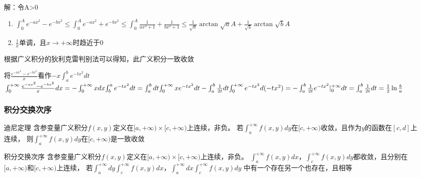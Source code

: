 \documentclass[xetex]{beamer}
\begin{document}
\begin{frame}
    解：令A>0
    \begin{enumerate}
        \item $\int_0^A{e^{-ax^2}-e^{-bx^2}}\le \int_0^A{e^{-ax^2}+e^{-bx^2}}\le \int_0^A{\frac{1}{ax^2+1}+\frac{1}{bx^2+1}}\le \frac{1}{\sqrt{a}}\arctan{\sqrt{a}A}+\frac{1}{\sqrt{b}}\arctan{\sqrt{b}A}$
        \item $\frac{1}{x}$单调，且$x\to +\infty$时趋近于0
    \end{enumerate}
    根据广义积分的狄利克雷判别法可以得知，此广义积分一致收敛

    将$\frac{e^{-ax^2}-e^{-bx^2}}{x}$看作$-x\int_a^b{e^{-tx^2}dt}$
    $\newline\int_{0}^{+\infty}{\frac{e^{-ax^2}-e^{-bx^2}}{x}dx}=-\int_{0}^{+\infty}{xdx}{\int_b^a{e^{-tx^2}dt}}
    =\int_{a}^{b}{dt}{\int_0^{+\infty}{xe^{-tx^2}dt}}
    \newline -\int_{a}^{b}{\frac{1}{2t}dt}{\int_0^{+\infty}{e^{-tx^2}d(-tx^2)}}
    =-\int_{a}^{b}{\frac{1}{2t}e^{-tx^2}|^{+\infty}_0 dt}
    =\int_{a}^{b}{\frac{1}{2t}dt}=\frac{1}{2}\ln \frac{b}{a}$
        
\end{frame}

\begin{frame}
    \frametitle{积分交换次序}
    \begin{block}{迪尼定理}
        含参变量广义积分$f(x,y)$定义在$[a,+\infty)\times[c,+\infty)$上连续，非负。
        若$\int_{a}^{+\infty}{f(x,y)dy}$在$[c,+\infty)$收敛，且作为$y$的函数在$[c,d]$上连续，
        则$\int_{a}^{+\infty}{f(x,y)dy}$在$[c,+\infty)$是一致收敛
    \end{block}
    \begin{block}{积分交换次序}
        含参变量广义积分$f(x,y)$定义在$[a,+\infty)\times[c,+\infty)$上连续，非负。
        $\int_{a}^{+\infty}{f(x,y)dx}$，$\int_{c}^{+\infty}{f(x,y)dy}$都收敛，且分别在$[a,+\infty)$和$[c,+\infty)$上连续，
        若$\int_{a}^{+\infty}{dy}\int_{c}^{+\infty}{f(x,y)dx}$，$\int_{a}^{+\infty}{dx}\int_{c}^{+\infty}{f(x,y)dy}$
        中有一个存在另一个也存在，且相等
    \end{block}
\end{frame}
\end{document}
